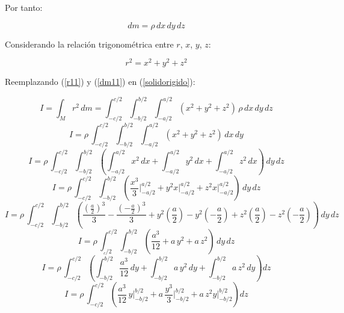 \documentclass[letter,oneside,11pt]{article}
\begin{document}
Por tanto:

\begin{equation}
    dm = \rho\, dx\, dy\, dz
\label{dm11}
\end{equation}

Considerando la relación trigonométrica entre $r$, $x$, $y$, $z$:

\begin{equation}
    r^2 = x^2 + y^2 + z^2
\label{r11}
\end{equation}

Reemplazando (\ref{r11}) y (\ref{dm11}) en (\ref{solidorigido}):

\begin{equation*}
    I = \int_{M} r^2\, dm = \int_{-c/2}^{c/2} \int_{-b/2}^{b/2} \int_{-a/2}^{a/2} (x^2 + y^2 + z^2)\, \rho\, dx\, dy\, dz
\end{equation*}
\begin{equation*}
    I = \rho\, \int_{-c/2}^{c/2} \int_{-b/2}^{b/2} \int_{-a/2}^{a/2} (x^2 + y^2 + z^2)\, dx \, dy
\end{equation*}
\begin{equation*}
    I = \rho\, \int_{-c/2}^{c/2} \int_{-b/2}^{b/2} \left( \int_{-a/2}^{a/2} x^2\, dx + \int_{-a/2}^{a/2} y^2\, dx + \int_{-a/2}^{a/2} z^2\, dx \right) \, dy\, dz
\end{equation*}
\begin{equation*}
    I = \rho\, \int_{-c/2}^{c/2} \int_{-b/2}^{b/2} \left( \frac{x^3}{3} \Biggr|_{-a/2}^{a/2} + y^2 x \Biggr|_{-a/2}^{a/2} + z^2 x \Biggr|_{-a/2}^{a/2} \right) \, dy\, dz
\end{equation*}
\begin{equation*}
    I = \rho\, \int_{-c/2}^{c/2} \int_{-b/2}^{b/2} \left( \frac{(\frac{a}{2})^3}{3} - \frac{(-\frac{a}{2})^3}{3} + y^2 \left( \frac{a}{2}\right) - y^2 \left( -\frac{a}{2}\right) + z^2 \left( \frac{a}{2}\right) - z^2 \left( -\frac{a}{2}\right) \right) \, dy\, dz
\end{equation*}
\begin{equation*}
    I = \rho\, \int_{_c/2}^{c/2} \int_{-b/2}^{b/2} \left( \frac{a^3}{12} + a\, y^2 + a\, z^2 \right) \, dy\, dz
\end{equation*}
\begin{equation*}
    I = \rho\, \int_{-c/2}^{c/2} \left( \int_{-b/2}^{b/2} \frac{a^3}{12}\, dy + \int_{-b/2}^{b/2} a\, y^2\, dy + \int_{-b/2}^{b/2} a\, z^2\, dy \right) dz
\end{equation*}
\begin{equation*}
    I = \rho\, \int_{-c/2}^{c/2} \left( \frac{a^3}{12}\, y \Biggr|_{-b/2}^{b/2} + a\, \frac{y^3}{3} \Biggr|_{-b/2}^{b/2} + a\, z^2 y \Biggr|_{-b/2}^{b/2} \right) dz
\end{equation*}
\end{document}
